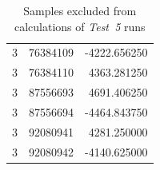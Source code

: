 \documentclass[a4paper, 12pt]{article}
\begin{document}
\begin{table}[!htb]
\begin{tabular}{|r|r|r|}
    3          & 76384109 & -4222.656250   \\
    3          & 76384110 &  4363.281250   \\
    3          & 87556693 &  4691.406250   \\
    3          & 87556694 & -4464.843750   \\
    3          & 92080941 &  4281.250000   \\
    3          & 92080942 & -4140.625000   \\
    \hline
  \end{tabular}
  \caption{Samples excluded from calculations of \textit{Test~5} runs}
  \label{table_test5_samples_excluded}
\end{table}



\end{document}
